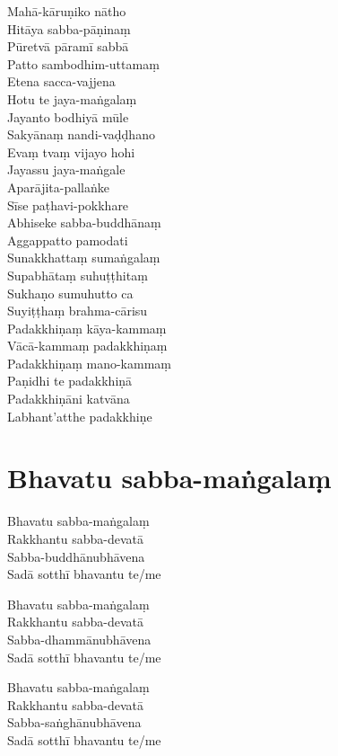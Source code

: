 \begin{paritta}

Mahā-kāruṇiko nātho\\
Hitāya sabba-pāṇinaṃ\\
Pūretvā pāramī sabbā\\
Patto sambodhim-uttamaṃ\\
Etena sacca-vajjena\\
Hotu te jaya-maṅgalaṃ\\
Jayanto bodhiyā mūle\\
Sakyānaṃ nandi-vaḍḍhano\\
Evaṃ tvaṃ vijayo hohi\\
Jayassu jaya-maṅgale\\
Aparājita-pallaṅke\\
Sīse paṭhavi-pokkhare\\
Abhiseke sabba-buddhānaṃ\\
Aggappatto pamodati\\
Sunakkhattaṃ sumaṅgalaṃ\\
Supabhātaṃ suhuṭṭhitaṃ\\
Sukhaṇo sumuhutto ca\\
Suyiṭṭhaṃ brahma-cārisu\\
Padakkhiṇaṃ kāya-kammaṃ\\
Vācā-kammaṃ padakkhiṇaṃ\\
Padakkhiṇaṃ mano-kammaṃ\\
Paṇidhi te padakkhiṇā\\
Padakkhiṇāni katvāna\\
Labhant'atthe padakkhiṇe


\end{paritta}

\clearpage

\chapter{Bhavatu sabba-maṅgalaṃ}%


\begin{paritta}
Bhavatu sabba-maṅgalaṃ\\
Rakkhantu sabba-devatā\\
Sabba-buddhānubhāvena\\
Sadā sotthī bhavantu te/me

Bhavatu sabba-maṅgalaṃ\\
Rakkhantu sabba-devatā\\
Sabba-dhammānubhāvena\\
Sadā sotthī bhavantu te/me

Bhavatu sabba-maṅgalaṃ\\
Rakkhantu sabba-devatā\\
Sabba-saṅghānubhāvena\\
Sadā sotthī bhavantu te/me
\end{paritta}

